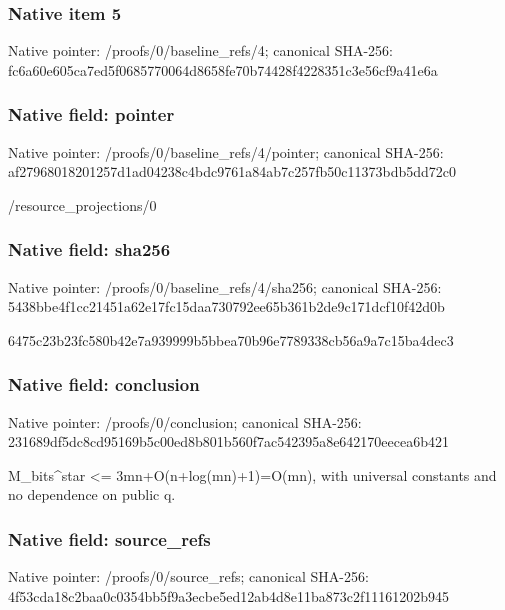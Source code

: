 \documentclass[10pt,a4paper]{article}
\begin{document}
\subsubsection{Native item 5}
Native pointer: /proofs/0/baseline\_\allowbreak{}refs/4; canonical SHA-256: fc6a60e605ca7ed5f0685770064d8658fe70b74428f4228351c3e56cf9a41e6a

\subsubsection{Native field: pointer}
Native pointer: /proofs/0/baseline\_\allowbreak{}refs/4/pointer; canonical SHA-256: af27968018201257d1ad04238c4bdc9761a84ab7c257fb50c11373bdb5dd72c0

\begingroup\raggedright\sloppy /\allowbreak{}resource\_\allowbreak{}projections/\allowbreak{}0\par\endgroup

\subsubsection{Native field: sha256}
Native pointer: /proofs/0/baseline\_\allowbreak{}refs/4/sha256; canonical SHA-256: 5438bbe4f1cc21451a62e17fc15daa730792ee65b361b2de9c171dcf10f42d0b

\begingroup\raggedright\sloppy 6475c23b23fc580b42e7a939999b5bbea70b96e7789338cb56a9a7c15ba4dec3\par\endgroup

\subsubsection{Native field: conclusion}
Native pointer: /proofs/0/conclusion; canonical SHA-256: 231689df5dc8cd95169b5c00ed8b801b560f7ac542395a8e642170eecea6b421

\begingroup\raggedright\sloppy M\_\allowbreak{}bits\textasciicircum{}star <=\allowbreak{} 3mn+O(n+log(mn)+1)=\allowbreak{}O(mn),\allowbreak{} with universal constants and no dependence on public q.\par\endgroup

\subsubsection{Native field: source\_\allowbreak{}refs}
Native pointer: /proofs/0/source\_\allowbreak{}refs; canonical SHA-256: 4f53cda18c2baa0c0354bb5f9a3ecbe5ed12ab4d8e11ba873c2f11161202b945
\end{document}
